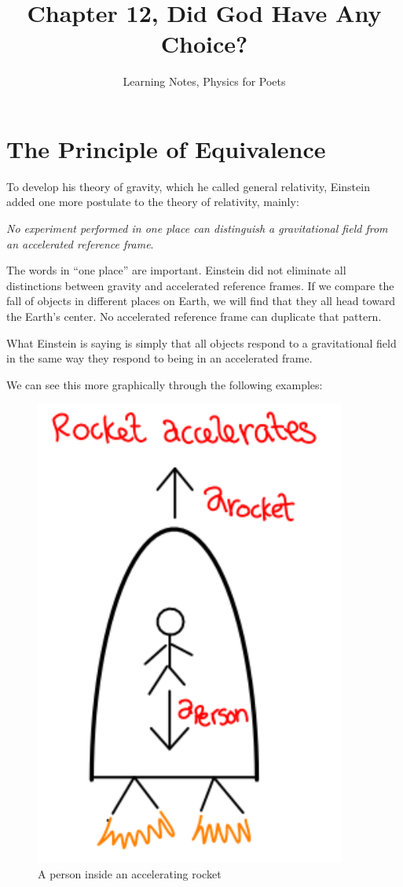 \documentclass[12pt, letterpaper]{article}
\title{Chapter 12, Did God Have Any Choice?}
\author{Learning Notes, Physics for Poets}
\date{}
\begin{document}
    \maketitle

    \section{The Principle of Equivalence}
    To develop his theory of gravity, which he called general relativity, 
    Einstein added one more postulate to the theory of relativity, mainly:
    
    \textit{No experiment performed in one place can distinguish a gravitational 
    field from an accelerated reference frame}.
    
    The words in ``one place'' are important. Einstein did not eliminate all 
    distinctions between gravity and accelerated reference frames. If we 
    compare the fall of objects in different places on Earth, we will find 
    that they all head toward the Earth's center. No accelerated reference 
    frame can duplicate that pattern.
    
    What Einstein is saying is simply that all objects respond to a gravitational 
    field in the same way they respond to being in an accelerated frame.
    
    We can see this more graphically through the following examples:
 
    \begin{figure}[h!]
        \caption{A person inside an accelerating rocket}
        \centering
        \includegraphics[scale=0.5]{rocket_accelerates_person.pdf}
    \end{figure}       
    
\end{document}
